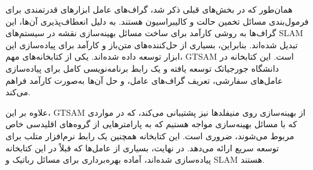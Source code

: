 همان‌طور که در بخش‌های قبلی ذکر شد، گراف‌های عامل ابزارهای قدرتمندی برای فرمول‌بندی مسائل تخمین حالت و کالیبراسیون هستند. به دلیل انعطاف‌پذیری آن‌ها، این گراف‌ها به روشی کارآمد برای ساخت مسائل بهینه‌سازی نقشه در سیستم‌های SLAM تبدیل شده‌اند. بنابراین، بسیاری از
حل‌کننده‌های متن‌باز و کارآمد برای پیاده‌سازی این ابزار توسعه داده شده‌اند. یکی از کتابخانه‌های
مهم، GTSAM 
\cite{gtsam}
است. این کتابخانه در دانشگاه جورجیاتک توسعه یافته و یک رابط برنامه‌نویسی کامل برای پیاده‌سازی عامل‌های سفارشی، تعریف گراف‌های عامل، و حل آن‌ها به‌صورت کارآمد فراهم می‌کند.

علاوه بر این، GTSAM از بهینه‌سازی روی منیفلدها نیز پشتیبانی می‌کند، که در مواردی که با مسائل بهینه‌سازی مواجه هستیم که به پارامترهایی از گروه‌های اقلیدسی خاص مربوط می‌شوند، ضروری است. این کتابخانه همچنین یک رابط نرم‌افزار متلب برای توسعه سریع ارائه می‌دهد. در نهایت، بسیاری از عامل‌ها که قبلاً در این کتابخانه پیاده‌سازی شده‌اند، آماده بهره‌برداری برای مسائل رباتیک و SLAM هستند.
